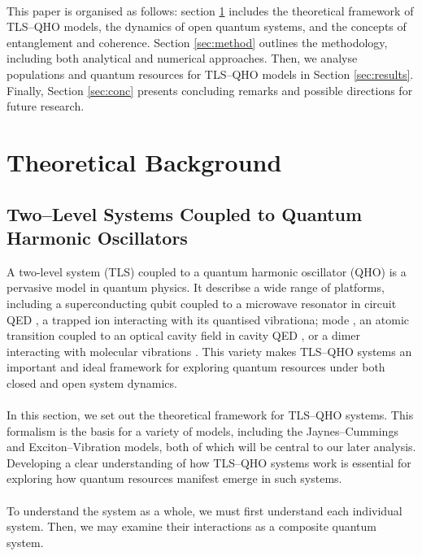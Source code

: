 \documentclass[12pt]{article}
\begin{document}
\\
This paper is organised as follows: section \ref{sec:theory} includes the theoretical framework of TLS--QHO models, the dynamics of open quantum systems, and the concepts of entanglement and coherence. Section \ref{sec:method} outlines the methodology, including both analytical and numerical approaches. Then, we analyse populations and quantum resources for TLS--QHO models in Section \ref{sec:results}. Finally, Section  \ref{sec:conc} presents concluding remarks and possible directions for future research.


\newpage

\section{Theoretical Background} \label{sec:theory}



\subsection{Two--Level Systems Coupled to Quantum Harmonic Oscillators} \label{sec:theory_sub_TLSQHO}

A two-level system (TLS) coupled to a quantum harmonic oscillator (QHO) is a pervasive model in quantum physics. It describse a wide range of platforms, including a superconducting qubit coupled to a microwave resonator in circuit QED \cite{Context2024-CircuitQED}, a trapped ion interacting with its quantised vibrationa; mode \cite{Context1992-Trapped_ions}, an atomic transition coupled to an optical cavity field in cavity QED \cite{Context2024-CQED_JCM}, or a dimer interacting with molecular vibrations \cite{ExVib2014-Alexandra}. This variety makes TLS–QHO systems an important and ideal framework for exploring quantum resources under both closed and open system dynamics.\\
\\
In this section, we set out the theoretical framework for TLS--QHO systems. This formalism is the basis for a variety of models, including the Jaynes--Cummings and Exciton--Vibration models, both of which will be central to our later analysis. Developing a clear understanding of how TLS--QHO systems work is essential for exploring how quantum resources manifest emerge in such systems. \\
\\
To understand the system as a whole, we must first understand each individual system. Then, we may examine their interactions as a composite quantum system.
\end{document}
